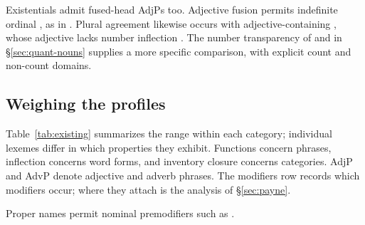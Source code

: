 \documentclass[12pt]{article}
\begin{document}
Existentials admit fused-head AdjPs too. Adjective fusion permits indefinite ordinal  \citep[416]{huddleston2002}, as in . Plural agreement likewise occurs with adjective-containing , whose adjective lacks number inflection \citep[418]{huddleston2002}. The number transparency of  and  in §\ref{sec:quant-nouns} supplies a more specific comparison, with explicit count and non-count domains.

\subsection{Weighing the profiles}\label{sec:membership}

Table~\ref{tab:existing} summarizes the range within each category; individual lexemes differ in which properties they exhibit. Functions concern phrases, inflection concerns word forms, and inventory closure concerns categories. AdjP and AdvP denote adjective and adverb phrases. The modifiers row records which modifiers occur; where they attach is the analysis of §\ref{sec:payne}.

Proper names permit nominal premodifiers such as  \citep[520]{huddleston2002}.
\end{document}
